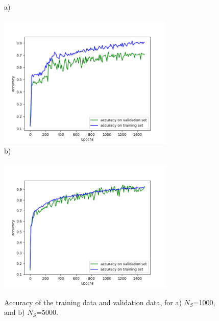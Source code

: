 \documentclass{iucr}
\begin{document}
\begin{figure}\label{fig:v12v13}
    a)~~~~~~~~~~~~~~~~~~~~~~~~~~~~~~~~~~~~~~~~~~~~~~~~~~~~~~~~~~~\\    \includegraphics[width=0.75\textwidth]{figures/v12.png}
    b)~~~~~~~~~~~~~~~~~~~~~~~~~~~~~~~~~~~~~~~~~~~~~~~~~~~~~~~~~~~\\ \includegraphics[width=0.75\textwidth]{figures/v13.png}
    \caption{Accuracy of the training data and validation data, for a) $N_S$=1000, and b) $N_S$=5000.
    }
\end{figure}
\end{document}
